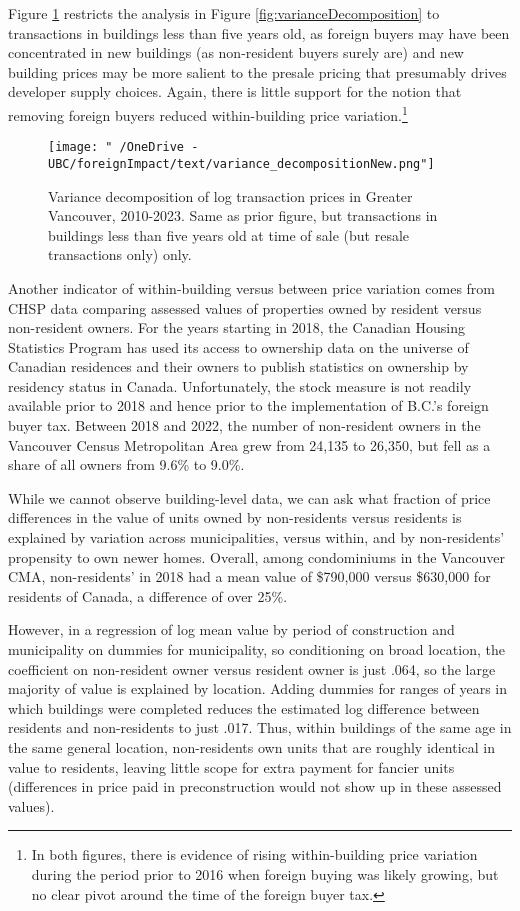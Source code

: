 \documentclass[12pt]{article}
\begin{document}
Figure \ref{fig:varianceDecompositionNew} restricts the analysis in Figure
\ref{fig:varianceDecomposition} to transactions in buildings less than five
years old, as foreign buyers may have been concentrated in new buildings (as
non-resident buyers surely are) and new building prices may be more salient to
the presale pricing that presumably drives developer supply choices. Again,
there is little support for the notion that removing foreign buyers reduced
within-building price variation.\footnote{In both figures, there is evidence of
rising within-building price variation during the period prior to 2016 when
foreign buying was likely growing, but no clear pivot around the time of the
foreign buyer tax.}

\begin{figure}
	\caption{\label{fig:varianceDecompositionNew} Variance decomposition of log transaction prices in Greater Vancouver, 2010-2023. Same as prior figure, but transactions in buildings less than five years old at time of sale (but resale transactions only) only.}
\texttt{[image: "~/OneDrive - UBC/foreignImpact/text/variance\_decompositionNew.png"]}
\end{figure}

Another indicator of within-building versus between price variation comes from
CHSP data comparing assessed values of properties owned by resident versus
non-resident owners. For the years starting in 2018, the Canadian Housing
Statistics Program has used its access to ownership data on the universe of
Canadian residences and their owners to publish statistics on ownership by
residency status in Canada.  Unfortunately, the stock measure is not readily
available prior to 2018 and hence prior to the implementation of B.C.'s foreign
buyer tax.  Between 2018 and 2022, the number of non-resident owners in the
Vancouver Census Metropolitan Area grew from 24,135 to 26,350, but fell as a
share of all owners from 9.6\% to 9.0\%.

While we cannot observe building-level data, we can ask what fraction of price
differences in the value of units owned by non-residents versus residents is
explained by variation across municipalities, versus within, and by
non-residents' propensity to own newer homes. Overall, among condominiums in
the Vancouver CMA, non-residents' in 2018 had a mean value of \$790,000 versus
\$630,000 for residents of Canada, a difference of over 25\%.

However, in a regression of log mean value by period of construction and
municipality on dummies for municipality, so conditioning on broad location,
the coefficient on non-resident owner versus resident owner is just .064, so
the large majority of value is explained by location. Adding dummies for ranges
of years in which buildings were completed reduces the estimated log difference
between residents and non-residents to just .017. Thus, within buildings of the
same age in the same general location, non-residents own units that are roughly
identical in value to residents, leaving little scope for extra payment for
fancier units (differences in price paid in preconstruction would not show up
in these assessed values).
\end{document}
